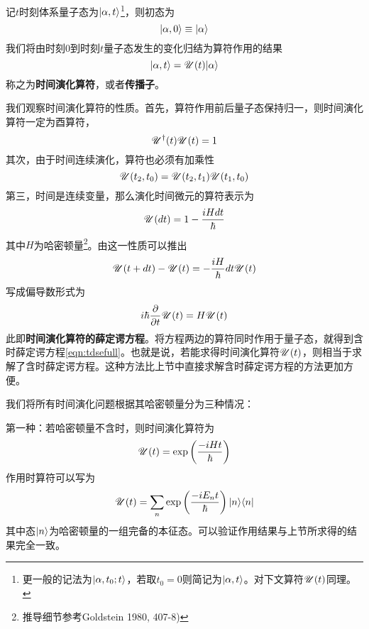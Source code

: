 记$ t $时刻体系量子态为$ |\alpha,t\rangle $\footnote{更一般的记法为$ |\alpha,t_0;t\rangle $，若取$ t_0=0 $则简记为$ |\alpha,t\rangle $。对下文算符$ \mathscr{U}(t) $同理。}，则初态为
\begin{equation}\label{key}
|\alpha,0\rangle\equiv|\alpha\rangle
\end{equation}
我们将由时刻0到时刻$ t $量子态发生的变化归结为算符作用的结果
\begin{equation}\label{key}
|\alpha,t\rangle=\mathscr{U}(t)|\alpha\rangle
\end{equation}
称之为\textbf{时间演化算符}，或者\textbf{传播子}。

我们观察时间演化算符的性质。首先，算符作用前后量子态保持归一，则时间演化算符一定为酉算符，
\begin{equation}\label{key}
\mathscr{U}^\dagger(t)\mathscr{U}(t)=1
\end{equation}
其次，由于时间连续演化，算符也必须有加乘性
\begin{equation}\label{key}
\mathscr{U}(t_2,t_0)=\mathscr{U}(t_2,t_1)\mathscr{U}(t_1,t_0)
\end{equation}
第三，时间是连续变量，那么演化时间微元的算符表示为
\begin{equation}\label{key}
\mathscr{U}(dt)=1-\dfrac{iHdt}{\hbar}
\end{equation}
其中$ H $为哈密顿量\footnote{推导细节参考Goldstein 1980, 407-8)}。由这一性质可以推出
\begin{equation}\label{key}
\mathscr{U}(t+dt)-\mathscr{U}(t)=-\dfrac{iH}{\hbar}dt\mathscr{U}(t)
\end{equation}
写成偏导数形式为
\begin{equation}\label{key}
i\hbar\dfrac{\partial}{\partial t}\mathscr{U}(t)=H\mathscr{U}(t)
\end{equation}
此即\textbf{时间演化算符的薛定谔方程}。将方程两边的算符同时作用于量子态，就得到含时薛定谔方程\eqref{eqn:tdsefull}。也就是说，若能求得时间演化算符$ \mathscr{U}(t) $，则相当于求解了含时薛定谔方程。这种方法比上节中直接求解含时薛定谔方程的方法更加方便。

我们将所有时间演化问题根据其哈密顿量分为三种情况：

第一种：若哈密顿量不含时，则时间演化算符为
\begin{equation}\label{key}
\mathscr{U}(t)=\exp\left(\dfrac{-iHt}{\hbar}\right)
\end{equation}
作用时算符可以写为
\begin{equation}\label{eqn:1.2.9}
\mathscr{U}(t)=\sum_n\exp\left(\dfrac{-iE_nt}{\hbar}\right)|n\rangle\langle n|
\end{equation}
其中态$ |n\rangle $为哈密顿量的一组完备的本征态。可以验证作用结果与上节所求得的结果完全一致。

